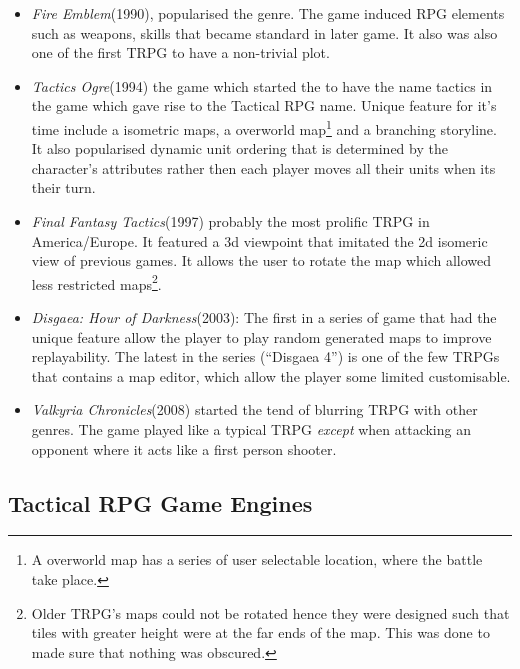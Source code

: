 \begin{itemize}
	
	\item \emph{Fire Emblem}(1990), popularised the genre. The game induced RPG elements such as weapons, skills that became standard in later game. It also was also one of the first TRPG to have a non-trivial plot. 

	\item \emph{Tactics Ogre}(1994) the game which started the to have the name tactics in the game  which gave rise to the Tactical RPG name\footnotemark[\value{footnote}]\cite{tactics}. Unique feature for it's time include a isometric maps, a overworld map\footnote{A overworld map has a series of user selectable location, where the battle take place.} and  a branching storyline. It also popularised dynamic unit ordering that is determined by the character's attributes rather then each player moves all their units when its their turn.

	\item \emph{Final Fantasy Tactics}(1997) probably the most prolific TRPG in America/Europe. It featured a 3d viewpoint that imitated  the 2d isomeric view of previous games.  It allows the user to rotate the map which allowed less restricted maps\footnote{Older TRPG's maps could not be rotated hence they were designed such that tiles with greater height were at the far ends of the map. This was done to made sure that nothing was obscured.}.
	
	\item  \emph{Disgaea: Hour of Darkness}(2003): The first in a series of game that had the unique feature allow the player to play random generated maps to improve replayability. The latest in the series (``Disgaea 4'') is one of the few TRPGs that contains a map editor, which allow the player some limited customisable. 


	\item  \emph{Valkyria Chronicles}(2008) started the tend of blurring TRPG with other genres. The game played like a typical TRPG \emph{except} when attacking an opponent where it acts like a first person shooter.

\end{itemize}


\subsection{Tactical RPG Game Engines}
\label{sub:tactical_rpg_game_engines}

